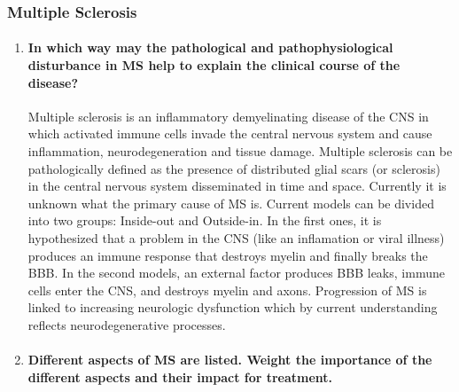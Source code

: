 \documentclass[12pt,article,oneside,a4paper]{memoir}
\begin{document}
\subsubsection{Multiple Sclerosis}
\begin{enumerate}
\item \paragraph{In which way may the pathological and pathophysiological
disturbance in MS help to explain the clinical course of the disease?}

Multiple sclerosis is an inflammatory demyelinating disease of the CNS in which
activated immune cells invade the central nervous system and cause
inflammation, neurodegeneration and tissue damage. Multiple sclerosis can be
pathologically defined as the presence of distributed glial scars (or
sclerosis) in the central nervous system disseminated in time and space.
Currently it is unknown what the primary cause of MS is. Current models can be
divided into two groups: Inside-out and Outside-in. In the first ones, it is
hypothesized that a problem in the CNS (like an inflamation or viral illness)
produces an immune response that destroys myelin and finally breaks the BBB. In
the second models, an external factor produces BBB leaks, immune cells enter
the CNS, and destroys myelin and axons. Progression of MS is linked to
increasing neurologic dysfunction which by current understanding reflects
neurodegenerative processes.

\item \paragraph{Different aspects of MS are listed. Weight the importance of
the different aspects and their impact for treatment.}
\label{question:MS-aspects}


\end{enumerate}
\end{document}
